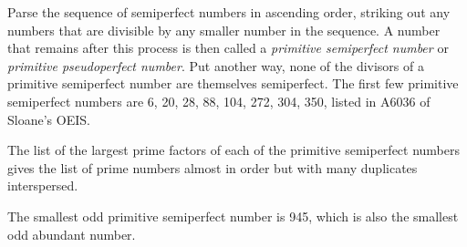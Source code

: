 \documentclass[12pt]{article}
\begin{document}
Parse the sequence of semiperfect numbers in ascending order, striking out any numbers that are divisible by any smaller number in the sequence. A number that remains after this process is then called a \emph{primitive semiperfect number} or  \emph{primitive pseudoperfect number}. Put another way, none of the divisors of a primitive semiperfect number are themselves semiperfect. The first few primitive semiperfect numbers are 6, 20, 28, 88, 104, 272, 304, 350, listed in A6036 of Sloane's OEIS.

The list of the largest prime factors of each of the primitive semiperfect numbers gives the list of prime numbers almost in order but with many duplicates interspersed.

The smallest odd primitive semiperfect number is 945, which is also the smallest odd abundant number.

\end{document}
